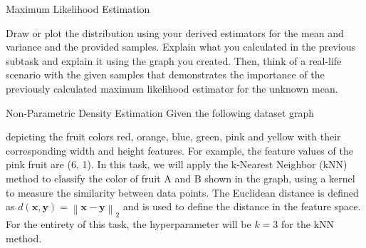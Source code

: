 \documentclass[
	english,
        solution=true
	]{tudaexercise}
\begin{document}
\begin{task}[points=20]{Maximum Likelihood Estimation}
\begin{subtask}[points=5]
Draw or plot the distribution using your derived estimators for the mean and variance and the provided samples. Explain what you calculated in the previous subtask and explain it using the graph you created. Then, think of a real-life scenario with the given samples that demonstrates the importance of the previously calculated maximum likelihood estimator for the unknown mean.

\begin{solution}

\end{solution}
\end{subtask}
\end{task}

\newpage

\begin{task}[points=9]{Non-Parametric Density Estimation}
Given the following dataset graph

\begin{center}
\end{center}

depicting the fruit colors red, orange, blue, green, pink and yellow with their corresponding width and height features. For example, the feature values of the pink fruit are (6, 1). In this task, we will apply the k-Nearest Neighbor (kNN) method to classify the color of fruit A and B shown in the graph, using a kernel to measure the similarity between data points. The Euclidean distance is defined as $d(\boldsymbol{x}, \boldsymbol{y}) = \left\| \boldsymbol{x} - \boldsymbol{y}\right\|_2$ and is used to define the distance in the feature space. For the entirety of this task, the hyperparameter will be $k = 3$ for the kNN method. 



\end{task}
\end{document}
